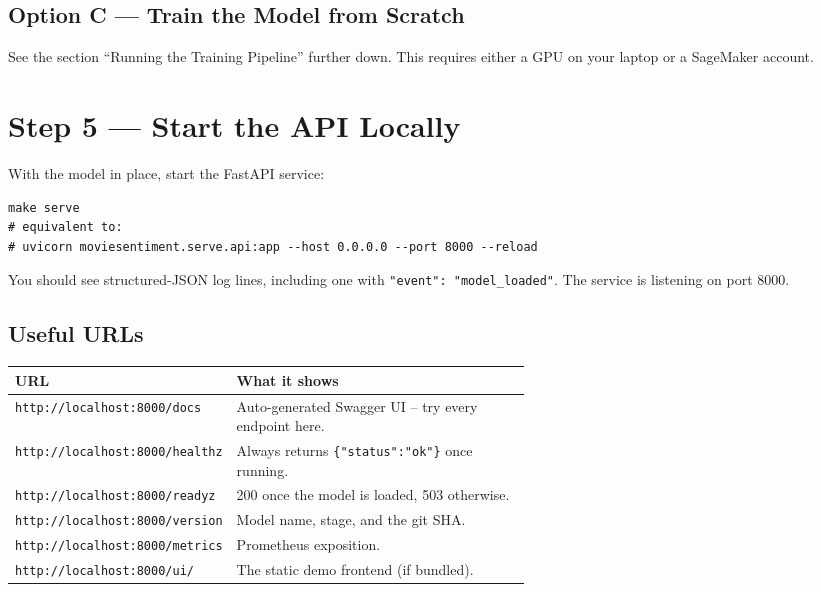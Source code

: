 \documentclass[11pt,a4paper]{article}
\begin{document}
\subsection{Option C --- Train the Model from Scratch}

See the section ``Running the Training Pipeline'' further down. This requires
either a GPU on your laptop or a SageMaker account.

\section{Step 5 --- Start the API Locally}

With the model in place, start the FastAPI service:

\begin{lstlisting}
make serve
# equivalent to:
# uvicorn moviesentiment.serve.api:app --host 0.0.0.0 --port 8000 --reload
\end{lstlisting}

\noindent You should see structured-JSON log lines, including one with
\texttt{"event": "model\_loaded"}. The service is listening on port 8000.

\subsection{Useful URLs}

\begin{longtable}{@{}lp{0.6\linewidth}@{}}
\toprule
\textbf{URL} & \textbf{What it shows} \\ \midrule \endhead
\texttt{http://localhost:8000/docs}        & Auto-generated Swagger UI -- try every endpoint here. \\
\texttt{http://localhost:8000/healthz}     & Always returns \texttt{\{"status":"ok"\}} once running. \\
\texttt{http://localhost:8000/readyz}      & 200 once the model is loaded, 503 otherwise. \\
\texttt{http://localhost:8000/version}     & Model name, stage, and the git SHA. \\
\texttt{http://localhost:8000/metrics}     & Prometheus exposition. \\
\texttt{http://localhost:8000/ui/}         & The static demo frontend (if bundled). \\
\bottomrule
\end{longtable}
\end{document}
